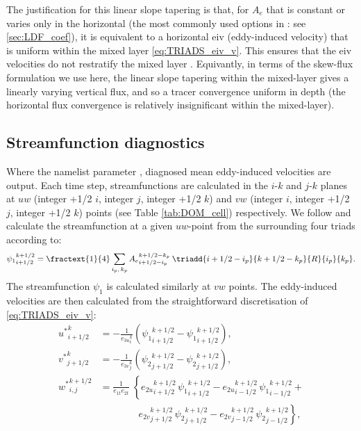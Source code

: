 \documentclass[../main/NEMO_manual]{subfiles}
\begin{document}
The justification for this linear slope tapering is that, for $A_e$ that is constant or varies only in
the horizontal (the most commonly used options in \NEMO: see \autoref{sec:LDF_coef}),
it is equivalent to a horizontal eiv (eddy-induced velocity) that is uniform within the mixed layer
\autoref{eq:TRIADS_eiv_v}.
This ensures that the eiv velocities do not restratify the mixed layer \citep{treguier.held.ea_JPO97,danabasoglu.ferrari.ea_JC08}.
Equivantly, in terms of the skew-flux formulation we use here,
the linear slope tapering within the mixed-layer gives a linearly varying vertical flux,
and so a tracer convergence uniform in depth
(the horizontal flux convergence is relatively insignificant within the mixed-layer).

\subsection{Streamfunction diagnostics}
\label{sec:TRIADS_sfdiag}

Where the namelist parameter ,
diagnosed mean eddy-induced velocities are output.
Each time step, streamfunctions are calculated in the $i$-$k$ and $j$-$k$ planes at
$uw$ (integer +1/2 $i$, integer $j$, integer +1/2 $k$) and $vw$ (integer $i$, integer +1/2 $j$, integer +1/2 $k$)
points (see Table \autoref{tab:DOM_cell}) respectively.
We follow \citep{griffies_bk04} and calculate the streamfunction at a given $uw$-point from
the surrounding four triads according to:
\[
  {\psi_1}_{i+1/2}^{k+1/2}={\fractext{1}{4}}\sum_{\substack{i_p,\,k_p}}
  {A_e}_{i+1/2-i_p}^{k+1/2-k_p}\:\triadd{i+1/2-i_p}{k+1/2-k_p}{R}{i_p}{k_p}.
\]
The streamfunction $\psi_1$ is calculated similarly at $vw$ points.
The eddy-induced velocities are then calculated from the straightforward discretisation of \autoref{eq:TRIADS_eiv_v}:
\[
  \begin{split}
    {u^*}_{i+1/2}^{k} & = - \frac{1}{{e_{3u}}_{i}^{k}}\left({\psi_1}_{i+1/2}^{k+1/2}-{\psi_1}_{i+1/2}^{k+1/2}\right),   \\
    {v^*}_{j+1/2}^{k} & = - \frac{1}{{e_{3v}}_{j}^{k}}\left({\psi_2}_{j+1/2}^{k+1/2}-{\psi_2}_{j+1/2}^{k+1/2}\right),   \\
    {w^*}_{i,j}^{k+1/2} & =    \frac{1}{e_{1t}e_{2t}}\; \left\{
      {e_{2u}}_{i+1/2}^{k+1/2} \,{\psi_1}_{i+1/2}^{k+1/2} -
      {e_{2u}}_{i-1/2}^{k+1/2} \,{\psi_1}_{i-1/2}^{k+1/2} \right. + \\
    \phantom{=} & \qquad\qquad\left. {e_{2v}}_{j+1/2}^{k+1/2} \,{\psi_2}_{j+1/2}^{k+1/2} - {e_{2v}}_{j-1/2}^{k+1/2} \,{\psi_2}_{j-1/2}^{k+1/2} \right\},
  \end{split}
\]

\subinc{}
\end{document}
